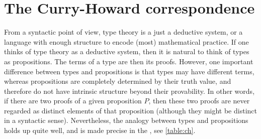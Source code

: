 \section{The Curry-Howard correspondence}



From a syntactic point of view, type theory is a just a deductive system, or a language with enough structure to encode (most) mathematical practice. If one thinks of type theory as a deductive system, then it is natural to think of types as propositions. The terms of a type are then its proofs. However, one important difference between types and propositions is that types may have different terms, whereas propositions are completely determined by their truth value, and therefore do not have intrinsic structure beyond their provability. In other words, if there are two proofs of a given proposition $P$, then these two proofs are never regarded as distinct elements of that proposition (although they might be distinct in a syntactic sense). Nevertheless, the analogy between types and propositions holds up quite well, and is made precise in the , see \cref{table:ch}.

